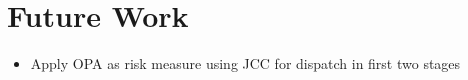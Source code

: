 
\chapter{Future Work}

\begin{itemize}
\item Apply OPA as risk measure using JCC for dispatch in first two stages
\end{itemize}


	
		
